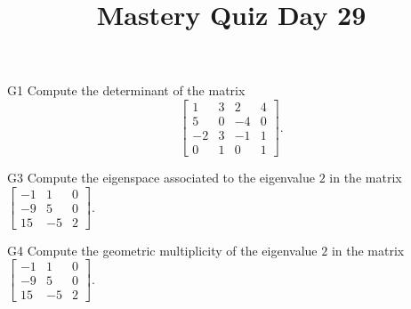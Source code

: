 \documentclass{sbgLAquiz}
\title{Mastery Quiz Day 29 }
\begin{document}
\begin{problem}{G1}
Compute the determinant of the matrix
\[
  \begin{bmatrix}
    1 & 3 & 2 & 4 \\
    5 & 0 & -4 & 0 \\
    -2 & 3 & -1 & 1 \\
    0 & 1 & 0 & 1
  \end{bmatrix}
.\]
\end{problem}

\begin{problem}{G3}
Compute the eigenspace associated to the eigenvalue $2$ in the matrix $\begin{bmatrix} -1 & 1 & 0 \\ -9 & 5 & 0 \\ 15 & -5 & 2 \end{bmatrix}$.
\end{problem}
\newpage

\begin{problem}{G4}
Compute the geometric multiplicity of the eigenvalue $2$ in the matrix $\begin{bmatrix} -1 & 1 & 0 \\ -9 & 5 & 0 \\ 15 & -5 & 2 \end{bmatrix}$.
\end{problem}
\end{document}
